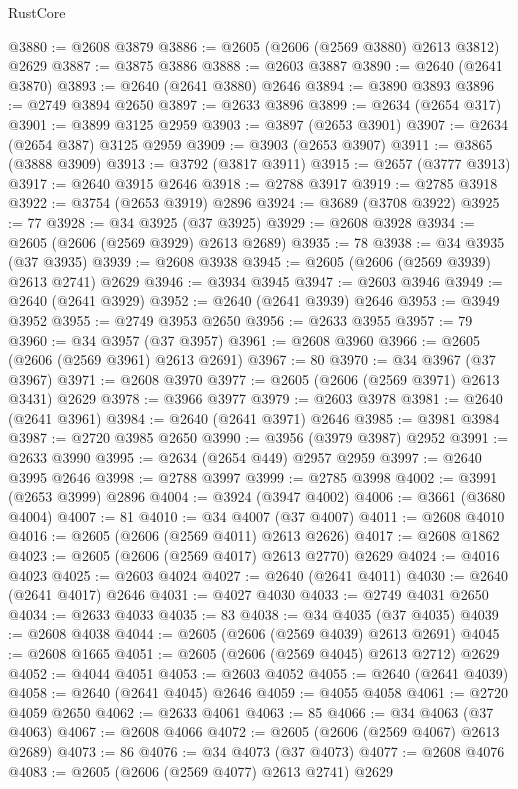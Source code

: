 \begin{lexlean}{RustCore}
\begin{coremodule}
@3880 := @2608 @3879
@3886 := @2605 (@2606 (@2569 @3880) @2613 @3812) @2629
@3887 := @3875 @3886
@3888 := @2603 @3887
@3890 := @2640 (@2641 @3870)
@3893 := @2640 (@2641 @3880) @2646
@3894 := @3890 @3893
@3896 := @2749 @3894 @2650
@3897 := @2633 @3896
@3899 := @2634 (@2654 @317)
@3901 := @3899 @3125 @2959
@3903 := @3897 (@2653 @3901)
@3907 := @2634 (@2654 @387) @3125 @2959
@3909 := @3903 (@2653 @3907)
@3911 := @3865 (@3888 @3909)
@3913 := @3792 (@3817 @3911)
@3915 := @2657 (@3777 @3913)
@3917 := @2640 @3915 @2646
@3918 := @2788 @3917
@3919 := @2785 @3918
@3922 := @3754 (@2653 @3919) @2896
@3924 := @3689 (@3708 @3922)
@3925 := 77
@3928 := @34 @3925 (@37 @3925)
@3929 := @2608 @3928
@3934 := @2605 (@2606 (@2569 @3929) @2613 @2689)
@3935 := 78
@3938 := @34 @3935 (@37 @3935)
@3939 := @2608 @3938
@3945 := @2605 (@2606 (@2569 @3939) @2613 @2741) @2629
@3946 := @3934 @3945
@3947 := @2603 @3946
@3949 := @2640 (@2641 @3929)
@3952 := @2640 (@2641 @3939) @2646
@3953 := @3949 @3952
@3955 := @2749 @3953 @2650
@3956 := @2633 @3955
@3957 := 79
@3960 := @34 @3957 (@37 @3957)
@3961 := @2608 @3960
@3966 := @2605 (@2606 (@2569 @3961) @2613 @2691)
@3967 := 80
@3970 := @34 @3967 (@37 @3967)
@3971 := @2608 @3970
@3977 := @2605 (@2606 (@2569 @3971) @2613 @3431) @2629
@3978 := @3966 @3977
@3979 := @2603 @3978
@3981 := @2640 (@2641 @3961)
@3984 := @2640 (@2641 @3971) @2646
@3985 := @3981 @3984
@3987 := @2720 @3985 @2650
@3990 := @3956 (@3979 @3987) @2952
@3991 := @2633 @3990
@3995 := @2634 (@2654 @449) @2957 @2959
@3997 := @2640 @3995 @2646
@3998 := @2788 @3997
@3999 := @2785 @3998
@4002 := @3991 (@2653 @3999) @2896
@4004 := @3924 (@3947 @4002)
@4006 := @3661 (@3680 @4004)
@4007 := 81
@4010 := @34 @4007 (@37 @4007)
@4011 := @2608 @4010
@4016 := @2605 (@2606 (@2569 @4011) @2613 @2626)
@4017 := @2608 @1862
@4023 := @2605 (@2606 (@2569 @4017) @2613 @2770) @2629
@4024 := @4016 @4023
@4025 := @2603 @4024
@4027 := @2640 (@2641 @4011)
@4030 := @2640 (@2641 @4017) @2646
@4031 := @4027 @4030
@4033 := @2749 @4031 @2650
@4034 := @2633 @4033
@4035 := 83
@4038 := @34 @4035 (@37 @4035)
@4039 := @2608 @4038
@4044 := @2605 (@2606 (@2569 @4039) @2613 @2691)
@4045 := @2608 @1665
@4051 := @2605 (@2606 (@2569 @4045) @2613 @2712) @2629
@4052 := @4044 @4051
@4053 := @2603 @4052
@4055 := @2640 (@2641 @4039)
@4058 := @2640 (@2641 @4045) @2646
@4059 := @4055 @4058
@4061 := @2720 @4059 @2650
@4062 := @2633 @4061
@4063 := 85
@4066 := @34 @4063 (@37 @4063)
@4067 := @2608 @4066
@4072 := @2605 (@2606 (@2569 @4067) @2613 @2689)
@4073 := 86
@4076 := @34 @4073 (@37 @4073)
@4077 := @2608 @4076
@4083 := @2605 (@2606 (@2569 @4077) @2613 @2741) @2629

\end{coremodule}
\end{lexlean}
